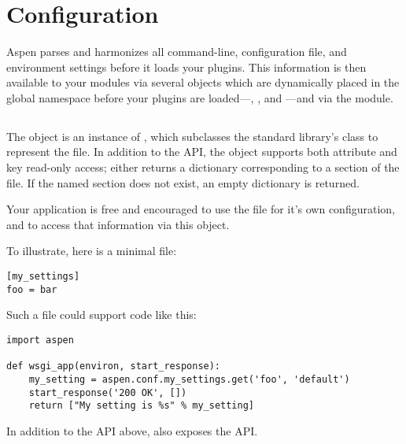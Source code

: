 \section{Configuration}
\label{api-Configuration}

Aspen parses and harmonizes all command-line, configuration file, and
environment settings before it loads your plugins. This information is then
available to your modules via several objects which are dynamically placed in
the global  namespace before your plugins are
loaded---, , and ---and via the
 module.


\subsection{}
\label{api-conf}

The  object is an instance of
, which subclasses the standard library's
 class to represent the
 file. In addition to the  API,
the object supports both attribute and key read-only access; either returns a
dictionary corresponding to a section of the  file. If the
named section does not exist, an empty dictionary is returned.

Your application is free and encouraged to use the  file for
it's own configuration, and to access that information via this object.

To illustrate, here is a minimal  file:

\begin{verbatim}
[my_settings]
foo = bar
\end{verbatim}

Such a file could support code like this:

\begin{verbatim}
import aspen

def wsgi_app(environ, start_response):
    my_setting = aspen.conf.my_settings.get('foo', 'default')
    start_response('200 OK', [])
    return ["My setting is %s" % my_setting]
\end{verbatim}


\begin{seealso}

{}{In addition to the API above,  also
exposes the  API.}

\end{seealso}


